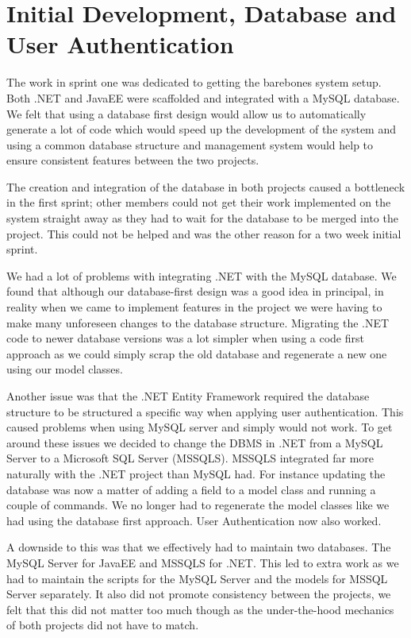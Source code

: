 \section{Initial Development, Database and User Authentication}
The work in sprint one was dedicated to getting the barebones system setup. Both .NET and JavaEE were scaffolded and integrated with a MySQL database. We felt that using a database first design would allow us to automatically generate a lot of code which would speed up the development of the system and using a common database structure and management system would help to ensure consistent features between the two projects. \par
The creation and integration of the database in both projects caused a bottleneck in the first sprint; other members could not get their work implemented on the system straight away as they had to wait for the database to be merged into the project. This could not be helped and was the other reason for a two week initial sprint. \par
We had a lot of problems with integrating .NET with the MySQL database. We found that although our database-first design was a good idea in principal, in reality when we came to implement features in the project we were having to make many unforeseen changes to the database structure. Migrating the .NET code to newer database versions was a lot simpler when using a code first approach as we could simply scrap the old database and regenerate a new one using our model classes. \par
Another issue was that the .NET Entity Framework required the database structure to be structured a specific way when applying user authentication. This caused problems when using MySQL server and simply would not work. To get around these issues we decided to change the DBMS in .NET from a MySQL Server to a Microsoft SQL Server (MSSQLS). MSSQLS integrated far more naturally with the .NET project than MySQL had. For instance updating the database was now a matter of adding a field to a model class and running a couple of commands. We no longer had to regenerate the model classes like we had using the database first approach. User Authentication now also worked. \par
A downside to this was that we effectively had to maintain two databases. The MySQL Server for JavaEE and MSSQLS for .NET. This led to extra work as we had to maintain the scripts for the MySQL Server and the models for MSSQL Server separately. It also did not promote consistency between the projects, we felt that this did not matter too much though as the under-the-hood mechanics of both projects did not have to match. \par

